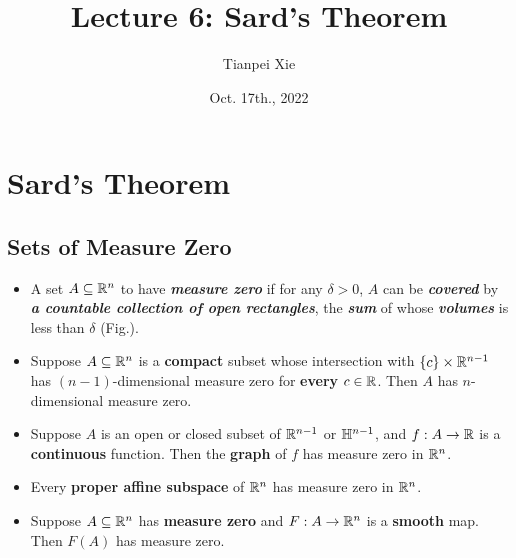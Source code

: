 \documentclass[11pt]{article}
\begin{document}
\title{Lecture 6: Sard's Theorem}
\author{ Tianpei Xie}
\date{Oct. 17th., 2022}
\maketitle
\tableofcontents
\newpage
\section{Sard's Theorem}
\subsection{Sets of Measure Zero}
\begin{itemize}
\item \begin{definition} 
A set $A \subseteq {\mathbb R}^n$ to have \emph{\textbf{measure zero}} if for any $\delta > 0$,  $A$ can be \emph{\textbf{covered}} by \emph{\textbf{a countable collection of open rectangles}}, the \emph{\textbf{sum}} of whose \emph{\textbf{volumes}} is less than $\delta$ (Fig.).
\end{definition}

\item \begin{lemma}\label{lemma: compact_intersection_measure_zero}
Suppose $A \subseteq {\mathbb R}^n$ is a \textbf{compact} subset whose intersection with $\left\{c\right\} \times {\mathbb R}^{n-1}$ has  $(n-1)$-dimensional measure zero for \textbf{every} $c \in {\mathbb R}$. Then $A$ has $n$-dimensional measure zero.
\end{lemma}

\item \begin{proposition}
Suppose $A$ is an open or closed subset of ${\mathbb R}^{n-1}$ or ${\mathbb H}^{n-1}$, and $f: A \rightarrow {\mathbb R}$ is a \textbf{continuous} function. Then the \textbf{graph} of $f$ has measure zero in ${\mathbb R}^n$.
\end{proposition}

\item \begin{corollary}
Every \textbf{proper affine subspace} of ${\mathbb R}^n$ has measure zero in ${\mathbb R}^n$.
\end{corollary}

\item \begin{proposition}
Suppose $A \subseteq {\mathbb R}^n$ has \textbf{measure zero} and $F: A \rightarrow {\mathbb R}^n$ is a \textbf{smooth} map. Then $F(A)$ has measure zero.
\end{proposition}


\end{itemize}
\end{document}
